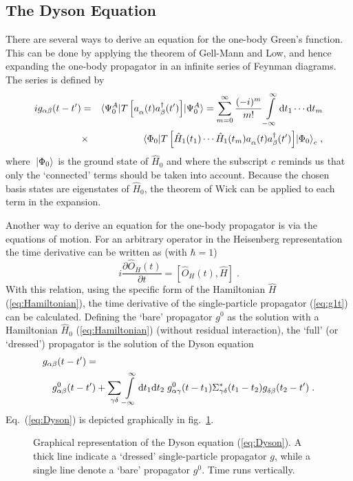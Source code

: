 \subsection{The Dyson Equation}
There are several ways to derive an equation for the one-body Green's 
function\cite{FW71,AGD63,Wi72}. This can be done by applying the 
theorem of Gell-Mann and Low\cite{FW71}, and hence expanding the one-body
propagator in an infinite series of Feynman diagrams. The series is defined 
by
%
%
\begin{eqnarray}
		ig_{\alpha\beta}(t - t')
	&=&
		\ME< \Psi^A_0 |
		T \left[
			\Oa{\alpha}(t) \Oc{\beta}(t') 
		\right]
		|\Psi^A_0 >
	=
		\sum_{m=0}^{\infty}
		\frac{(-i)^m}{m!}
		\int\limits_{-\infty}^{\infty} {\rm d} t_1 \cdots {\rm d} t_m
	\nonumber\\
	&\times&
		\ME< \Phi_0 |
		T\left[
			\hat{H}_1(t_1)\cdots \hat{H}_1(t_m)
			\Oa{\alpha}(t) \Oc{\beta}(t') 
 		\right]
		|\Phi_0 >_c
	\label{eq:GMLg} 
	\;,
	\end{eqnarray}
%
where $\;| \Phi_0 \rangle$ is the ground state of $\hat{H}_0$ and
where the subscript $c$ reminds us that only the `connected' terms should
be taken into account.
Because the chosen
basis states are eigenstates of $\hat{H}_0$, the theorem of Wick\cite{FW71}
can be applied to each term in the expansion.

Another way to 
derive an equation for the one-body propagator is via the equations of motion.
For an arbitrary operator in the Heisenberg
representation the time derivative can be written as (with $\hbar=1$)
%
	\begin{equation}
		i\frac{\partial \hat{O}_H(t)}{\partial t}
	=
		\left[
			\hat{O}_H(t),\hat{H}
		\right]
	\;.
	\end{equation}
%
With this relation, using the specific form of the Hamiltonian $\hat{H}$ 
(\ref{eq:Hamiltonian}), the time derivative of the single-particle propagator
(\ref{eq:g1t}) can be calculated. Defining the `bare' propagator $g^0$ as the 
solution
with a Hamiltonian $\hat{H}_0$ (\ref{eq:Hamiltonian}) 
(without residual interaction), the `full' (or `dressed') 
propagator is the solution of the Dyson equation\cite{FW71}
%
	\begin{eqnarray}
	\lefteqn{%
		g_{\alpha\beta}(t-t')
	=}
	\label{eq:Dyson} \\
	&&
		g^0_{\alpha\beta}(t-t')
	+
		\sum_{\gamma\delta}
		\int\limits_{-\infty}^{\infty} 
		{\rm d} t_1 {\rm d} t_2 
		\;
		g^0_{\alpha\gamma}(t-t_1)
		\Sigma^\ast_{\gamma\delta}(t_1-t_2)
		g^{\phantom{0}}_{\delta\beta}(t_2-t')
	\nonumber
	\;.
	\end{eqnarray}
%
Eq.~(\ref{eq:Dyson}) is depicted graphically in fig.~\ref{fig:Dyson}.
\begin{figure}
\centerline{
}
\caption[]{Graphical representation of the Dyson equation (\ref{eq:Dyson}).
A thick line indicate a `dressed' single-particle propagator $g$, 
while a single line denote a `bare' propagator $g^0$. Time runs vertically.
\label{fig:Dyson}
}
\end{figure}

